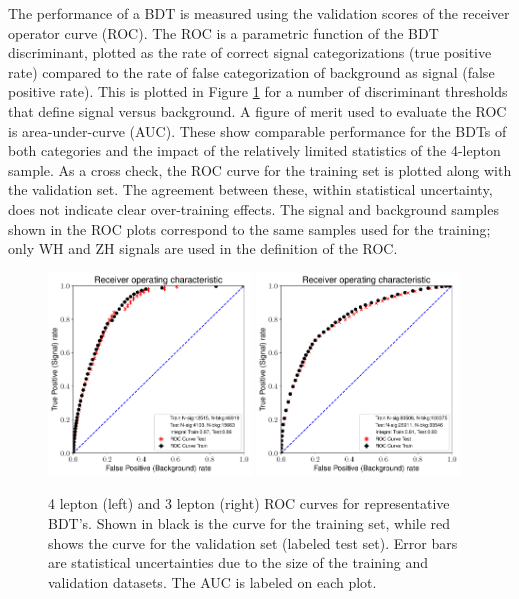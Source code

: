 The performance of a BDT is measured using the validation scores of the receiver operator curve (ROC).
The ROC is a parametric function of the BDT discriminant, plotted as the rate of correct signal categorizations (true positive rate) compared to the rate of false categorization of background as signal (false positive rate).
This is plotted in Figure \ref{fig:hmmBdtRoc} for a number of discriminant thresholds that define signal versus background.
A figure of merit used to evaluate the ROC is area-under-curve (AUC).
These show comparable performance for the BDTs of both categories and the impact of the relatively limited statistics of the 4-lepton sample.
As a cross check, the ROC curve for the training set is plotted along with the validation set. The agreement between these, within statistical uncertainty, does not indicate clear over-training effects.
The signal and background samples shown in the ROC plots correspond to the same samples used for the training; only WH and ZH signals are used in the definition of the ROC.

\begin{figure}[htpb]
  \centering
  \includegraphics[width=0.48\textwidth]{figures/hmm/bdtHist/roc-4lep-ZH-AllBackground-0-depth2-nEst80tag-new-AllBackground.pdf}
  \includegraphics[width=0.48\textwidth]{figures/hmm/bdtHist/roc-3lep-WH-AllBackground-0-depth2-nEst50tag-new-AllBackground.pdf}
  \caption{4 lepton (left) and 3 lepton (right) ROC curves for representative BDT's. Shown in black is the curve for the training set, while red shows the curve for the validation set (labeled test set). Error bars are statistical uncertainties due to the size of the training and validation datasets. The AUC is labeled on each plot.}
    \label{fig:hmmBdtRoc}
\end{figure}

